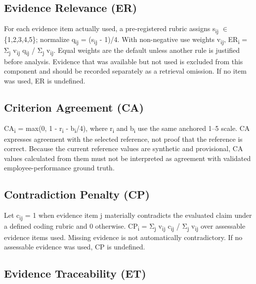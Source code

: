 \documentclass[
  10pt,
  a4paper,
  runningheads]{llncs}
\begin{document}
\subsection{Evidence Relevance (ER)}\label{evidence-relevance-er}

For each evidence item actually used, a pre-registered rubric assigns
s\textsubscript{i}\textsubscript{j} $\in$ \{1,2,3,4,5\}; normalize q\textsubscript{i}\textsubscript{j} = (s\textsubscript{i}\textsubscript{j} - 1)/4. With non-negative use
weights v\textsubscript{i}\textsubscript{j}, ER\textsubscript{i} = Σ\textsubscript{j} v\textsubscript{i}\textsubscript{j} q\textsubscript{i}\textsubscript{j} / Σ\textsubscript{j} v\textsubscript{i}\textsubscript{j}. Equal weights are the default
unless another rule is justified before analysis. Evidence that was
available but not used is excluded from this component and should be
recorded separately as a retrieval omission. If no item was used, ER is
undefined.

\subsection{Criterion Agreement (CA)}\label{criterion-agreement-ca}

CA\textsubscript{i} = max(0, 1 - \textbar r\textsubscript{i} - b\textsubscript{i}\textbar/4), where r\textsubscript{i} and b\textsubscript{i} use the
same anchored 1--5 scale. CA expresses agreement with the selected
reference, not proof that the reference is correct. Because the current
reference values are synthetic and provisional, CA values calculated
from them must not be interpreted as agreement with validated
employee-performance ground truth.

\subsection{Contradiction Penalty
(CP)}\label{contradiction-penalty-cp}

Let c\textsubscript{i}\textsubscript{j} = 1 when evidence item j materially contradicts the evaluated
claim under a defined coding rubric and 0 otherwise. CP\textsubscript{i} = Σ\textsubscript{j} v\textsubscript{i}\textsubscript{j} c\textsubscript{i}\textsubscript{j} /
Σ\textsubscript{j} v\textsubscript{i}\textsubscript{j} over assessable evidence items used. Missing evidence is not
automatically contradictory. If no assessable evidence was used, CP is
undefined.

\subsection{Evidence Traceability
(ET)}\label{evidence-traceability-et}
\end{document}
